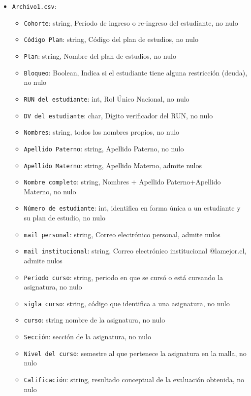 \documentclass[12pt]{article}
\begin{document}
\begin{itemize}
    \item \texttt{Archivo1.csv}:
    \begin{itemize}
        \item \texttt{Cohorte}: string, Período de ingreso o re-ingreso del estudiante, no nulo
        \item \texttt{Código Plan}: string, Código del plan de estudios, no nulo
        \item \texttt{Plan}: string, Nombre del plan de estudios, no nulo
        \item \texttt{Bloqueo}: Boolean, Indica si el estudiante tiene alguna restricción (deuda), no nulo
        \item \texttt{RUN del estudiante}: int, Rol Único Nacional, no nulo
        \item \texttt{DV del estudiante}: char, Dígito verificador del RUN, no nulo
        \item \texttt{Nombres}: string, todos los nombres propios, no nulo
        \item \texttt{Apellido Paterno}: string, Apellido Paterno, no nulo
        \item \texttt{Apellido Materno}: string, Apellido Materno, admite nulos
        \item \texttt{Nombre completo}: string, Nombres + Apellido Paterno+Apellido Materno, no nulo
        \item \texttt{Número de estudiante}: int, identifica en forma única a un estudiante y su plan de estudio, no nulo
        \item \texttt{mail personal}: string, Correo electrónico personal, admite nulos
        \item \texttt{mail institucional}: string, Correo electrónico institucional @lamejor.cl, admite nulos
        \item \texttt{Periodo curso}: string, periodo en que se cursó o está cursando la asignatura, no nulo
        \item \texttt{sigla curso}: string, código que identifica a una asignatura, no nulo
        \item \texttt{curso}: string nombre de la asignatura, no nulo
        \item \texttt{Sección}: sección de la asignatura, no nulo
        \item \texttt{Nivel del curso}: semestre al que pertenece la asignatura en la malla, no nulo
        \item \texttt{Calificación}: string, resultado conceptual de la evaluación obtenida, no nulo

\end{itemize}
\end{itemize}
\end{document}
